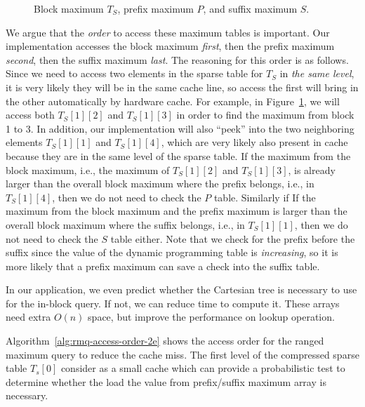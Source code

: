 

\begin{figure}[!thb]
  \centering {}  \caption{Block maximum $T_S$, prefix maximum $P$, and suffix
    maximum $S$.}
  \label{fig:compressed-sp-opt}
\end{figure}

We argue that the {\em order} to access these maximum tables is
important.  Our implementation accesses the block maximum {\em first},
then the prefix maximum {\em second}, then the suffix maximum {\em
  last}.  The reasoning for this order is as follows.  Since we need
to access two elements in the sparse table for $T_S$ in {\em the same
  level}, it is very likely they will be in the same cache line, so
access the first will bring in the other automatically by hardware
cache.  For example, in Figure~\ref{fig:compressed-sp-opt}, we will
access both $T_{S}[1][2]$ and $T_{S}[1][3]$ in order to find the
maximum from block 1 to 3.  In addition, our implementation will also
``peek'' into the two neighboring elements $T_{S}[1][1]$ and
$T_{S}[1][4]$, which are very likely also present in cache because
they are in the same level of the sparse table.  If the maximum from
the block maximum, i.e., the maximum of $T_{S}[1][2]$ and
$T_{S}[1][3]$, is already larger than the overall block maximum where
the prefix belongs, i.e., in $T_{S}[1][4]$, then we do not need to
check the $P$ table.  Similarly if If the maximum from the block
maximum and the prefix maximum is larger than the overall block maximum
where the suffix belongs, i.e., in $T_{S}[1][1]$, then we do not need
to check the $S$ table either.  Note that we check for the prefix
before the suffix since the value of the dynamic programming table is
{\em increasing}, so it is more likely that a prefix maximum can save a
check into the suffix table.




  
In our application, we even predict whether the Cartesian tree is
necessary to use for the in-block query. If not, we can reduce time to
compute it. These arrays need extra $O(n)$ space, but improve the
performance on lookup operation.

Algorithm~\ref{alg:rmq-access-order-2e} shows the access order for the
ranged maximum query to reduce the cache miss.  The first level of the
compressed sparse table $T_s[0]$ consider as a small cache which can
provide a probabilistic test to determine whether the load the value
from prefix/suffix maximum array is necessary.



